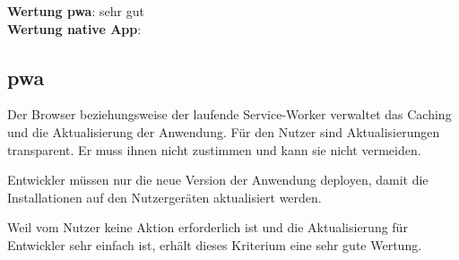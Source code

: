 \textbf{Wertung \ac{pwa}}: sehr gut\\
\textbf{Wertung native App}:  \\

\subsection{\ac{pwa}}
Der Browser beziehungsweise der laufende Service-Worker verwaltet das Caching und die Aktualisierung der Anwendung. Für den Nutzer sind Aktualisierungen transparent. Er muss ihnen nicht zustimmen und kann sie nicht vermeiden. 

Entwickler müssen nur die neue Version der Anwendung deployen, damit die Installationen auf den Nutzergeräten aktualisiert werden.

Weil vom Nutzer keine Aktion erforderlich ist und die Aktualisierung für Entwickler sehr einfach ist, erhält dieses Kriterium eine sehr gute Wertung.
